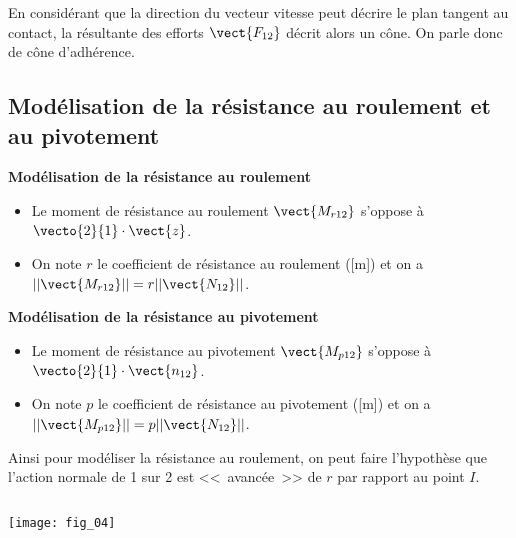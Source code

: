\begin{rem}
En considérant que la direction du vecteur vitesse peut décrire le plan tangent au contact, la résultante des efforts $\vect{F_{12}}$ décrit alors un cône. On parle donc de cône d'adhérence. 
\end{rem}

\subsection{Modélisation de la résistance au roulement et au pivotement}
\noindent\begin{minipage}[t]{.49\linewidth}
\begin{center}
\textbf{Modélisation de la résistance au roulement}
\end{center}
\begin{itemize}
\item Le moment de résistance au roulement $\vect{M_{r12}}$ s'oppose à $\vecto{2}{1}\cdot \vect{z}$. 
\item On note $r$ le coefficient de résistance au roulement ([m]) et on a $||\vect{M_{r12}}||=r||\vect{N_{12}} ||$.
\end{itemize}

\end{minipage}\hfill
\begin{minipage}[t]{.49\linewidth}
\begin{center}
\textbf{Modélisation de la résistance au pivotement}
\end{center}
\begin{itemize}
\item Le moment de résistance au pivotement $\vect{M_{p12}}$ s'oppose à $\vecto{2}{1}\cdot \vect{n_{12}}$. 
\item On note $p$ le coefficient de résistance au pivotement ([m]) et on a $||\vect{M_{p12}}||=p||\vect{N_{12}} ||$.
\end{itemize}
\end{minipage}

\vspace{1cm}

\noindent\begin{minipage}[t]{.69\linewidth}
Ainsi pour modéliser la résistance au roulement, on peut faire l'hypothèse que l'action normale de 1 sur 2 est <<~avancée~>> de $r$ par rapport au point $I$. 
\end{minipage}
\hfill
\begin{minipage}[t]{.29\linewidth}
$\quad$
\vspace{-.5cm}
\begin{center}
\texttt{[image: fig\_04]}
\end{center}
\end{minipage}

